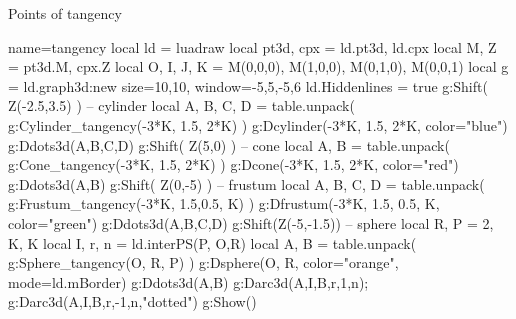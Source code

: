 \begin{demo}{Points of tangency}
\begin{luadraw}{name=tangency}
local ld = luadraw
local pt3d, cpx = ld.pt3d, ld.cpx
local M, Z = pt3d.M, cpx.Z
local O, I, J, K = M(0,0,0), M(1,0,0), M(0,1,0), M(0,0,1)
local g = ld.graph3d:new{ size={10,10}, window={-5,5,-5,6} }
ld.Hiddenlines = true
g:Shift( Z(-2.5,3.5) ) -- cylinder
local A, B, C, D = table.unpack( g:Cylinder_tangency(-3*K, 1.5, 2*K) )
g:Dcylinder(-3*K, 1.5, 2*K, {color="blue"})
g:Ddots3d({A,B,C,D})
g:Shift( Z(5,0) ) -- cone
local A, B = table.unpack( g:Cone_tangency(-3*K, 1.5, 2*K) )
g:Dcone(-3*K, 1.5, 2*K, {color="red"})
g:Ddots3d({A,B})
g:Shift( Z(0,-5) ) -- frustum
local A, B, C, D = table.unpack( g:Frustum_tangency(-3*K, 1.5,0.5, K) )
g:Dfrustum(-3*K, 1.5, 0.5, K, {color="green"})
g:Ddots3d({A,B,C,D})
g:Shift(Z(-5,-1.5)) -- sphere
local R, P = 2, {K, K}
local I, r, n = ld.interPS(P, {O,R})
local A, B = table.unpack( g:Sphere_tangency(O, R, P) )
g:Dsphere(O, R, {color="orange", mode=ld.mBorder})
g:Ddots3d({A,B})
g:Darc3d(A,I,B,r,1,n); g:Darc3d(A,I,B,r,-1,n,"dotted")
g:Show()
\end{luadraw}
\end{demo}
